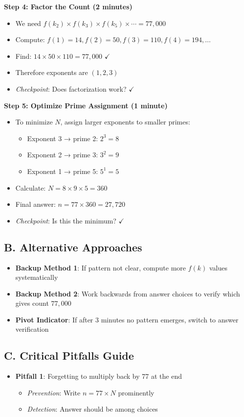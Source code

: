 \documentclass[11pt]{article}
\begin{document}
\begin{roadmapbox}
\textbf{Step 4: Factor the Count (2 minutes)}
\begin{itemize}[leftmargin=*]
    \item We need $f(k_2) \times f(k_3) \times f(k_5) \times \cdots = 77,000$
    \item Compute: $f(1) = 14, f(2) = 50, f(3) = 110, f(4) = 194, \ldots$
    \item Find: $14 \times 50 \times 110 = 77,000$ \quad $\checkmark$
    \item Therefore exponents are $(1, 2, 3)$
    \item \textit{Checkpoint}: Does factorization work? $\checkmark$
\end{itemize}

\textbf{Step 5: Optimize Prime Assignment (1 minute)}
\begin{itemize}[leftmargin=*]
    \item To minimize $N$, assign larger exponents to smaller primes:
    \begin{itemize}
        \item Exponent 3 → prime 2: $2^3 = 8$
        \item Exponent 2 → prime 3: $3^2 = 9$
        \item Exponent 1 → prime 5: $5^1 = 5$
    \end{itemize}
    \item Calculate: $N = 8 \times 9 \times 5 = 360$
    \item Final answer: $n = 77 \times 360 = 27,720$
    \item \textit{Checkpoint}: Is this the minimum? $\checkmark$
\end{itemize}

\subsection*{B. Alternative Approaches}
\begin{itemize}[leftmargin=*]
    \item \textbf{Backup Method 1}: If pattern not clear, compute more $f(k)$ values systematically
    \item \textbf{Backup Method 2}: Work backwards from answer choices to verify which gives count $77,000$
    \item \textbf{Pivot Indicator}: If after 3 minutes no pattern emerges, switch to answer verification
\end{itemize}

\subsection*{C. Critical Pitfalls Guide}
\begin{itemize}[leftmargin=*]
    \item \textbf{Pitfall 1}: Forgetting to multiply back by 77 at the end
    \begin{itemize}
        \item \textit{Prevention}: Write $n = 77 \times N$ prominently
        \item \textit{Detection}: Answer should be among choices
    \end{itemize}
    

\end{itemize}
\end{roadmapbox}
\end{document}
